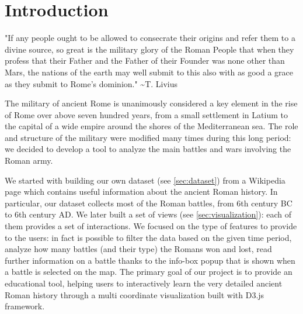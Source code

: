 \section{Introduction}
\begin{displayquote}
    "If any people ought to be allowed to consecrate their origins and refer them to a divine source, so great is the military glory of the Roman People that when they profess that their Father and the Father of their Founder was none other than Mars, the nations of the earth may well submit to this also with as good a grace as they submit to Rome's dominion." \textasciitilde T. Livius
\end{displayquote}

The military of ancient Rome is unanimously considered a key element in the rise of Rome over above seven hundred years, from a small settlement in Latium to the capital of a wide empire around the shores of the Mediterranean sea.
The role and structure of the military were modified many times during this long period: we decided to develop a tool to analyze the main battles and wars involving the Roman army.

We started with building our own dataset (see \ref{sec:dataset}) from a Wikipedia page which contains useful information about the ancient Roman history.
In particular, our dataset collects most of the Roman battles, from 6th century BC to 6th century AD. We later built a set of views (see \ref{sec:visualization}): each of them provides a set of interactions.
We focused on the type of features to provide to the users: in fact is possible to filter the data based on the given time period, analyze how many battles (and their type) the Romans won and lost, read further information on a battle thanks to the info-box popup that is shown when a battle is selected on the map.
The primary goal of our project is to provide an educational tool, helping users to interactively learn the very detailed ancient Roman history through a multi coordinate visualization built with D3.js framework.
